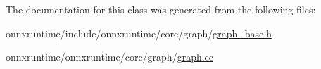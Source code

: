 The documentation for this class was generated from the following files\+:\begin{DoxyCompactItemize}
\item 
onnxruntime/include/onnxruntime/core/graph/\mbox{\hyperlink{graph__base_8h}{graph\+\_\+base.\+h}}\item 
onnxruntime/onnxruntime/core/graph/\mbox{\hyperlink{graph_8cc}{graph.\+cc}}\end{DoxyCompactItemize}
